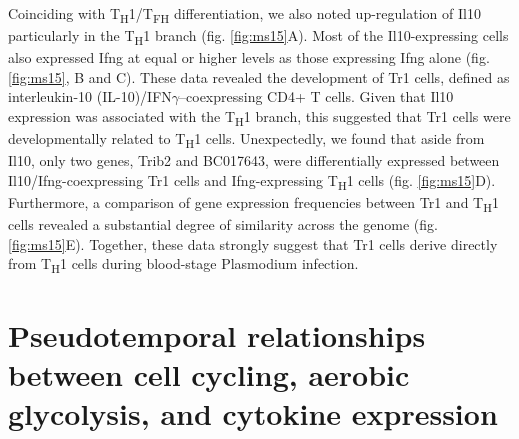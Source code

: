 Coinciding with T\textsubscript{H}1/T\textsubscript{FH} differentiation, we also noted up-regulation of Il10 particularly in the T\textsubscript{H}1 branch (fig.  \ref{fig:ms15}A). Most of the Il10-expressing cells also expressed Ifng at equal or higher levels as those expressing Ifng alone (fig.  \ref{fig:ms15}, B and C). These data revealed the development of Tr1 cells, defined as interleukin-10 (IL-10)/IFN\( \gamma \)–coexpressing CD4+ T cells. Given that Il10 expression was associated with the T\textsubscript{H}1 branch, this suggested that Tr1 cells were developmentally related to T\textsubscript{H}1 cells. Unexpectedly, we found that aside from Il10, only two genes, Trib2 and BC017643, were differentially expressed between Il10/Ifng-coexpressing Tr1 cells and Ifng-expressing T\textsubscript{H}1 cells (fig.  \ref{fig:ms15}D). Furthermore, a comparison of gene expression frequencies between Tr1 and T\textsubscript{H}1 cells revealed a substantial degree of similarity across the genome (fig.  \ref{fig:ms15}E). Together, these data strongly suggest that Tr1 cells derive directly from T\textsubscript{H}1 cells during blood-stage Plasmodium infection.

\section{Pseudotemporal relationships between cell cycling, aerobic glycolysis, and cytokine expression}

